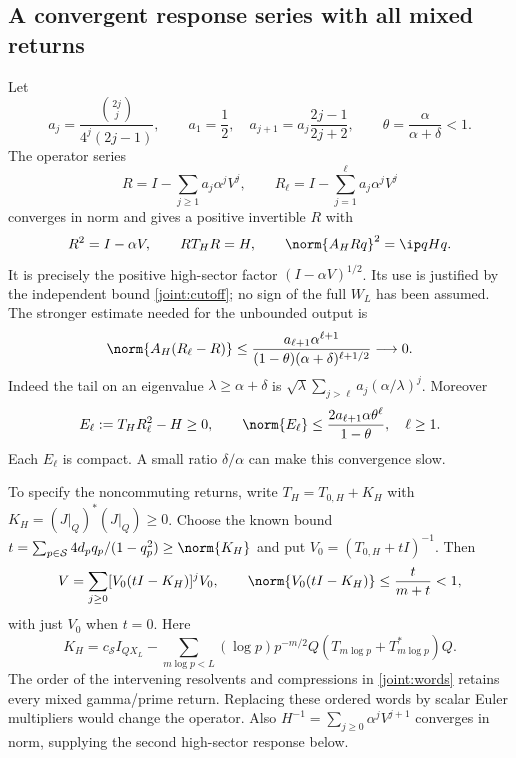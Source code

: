 \subsection{A convergent response series with all mixed returns}
Let
\[
a_j=\frac{\binom{2j}{j}}{4^j(2j-1)},\qquad
a_1=\frac12,\quad a_{j+1}=a_j\frac{2j-1}{2j+2},\qquad
\theta=\frac{\alpha}{\alpha+\delta}<1.
\]
The operator series
\begin{equation}\label{joint:series}
R=I-\sum_{j\ge1}a_j\alpha^jV^j,\qquad
R_\ell=I-\sum_{j=1}^{\ell}a_j\alpha^jV^j
\end{equation}
converges in norm and gives a positive invertible $R$ with
\[
R^2=I-\alpha V,\qquad RT_HR=H,\qquad
\norm{A_HRq}^2=\ip q{Hq}.
\]
It is precisely the positive high-sector factor
$(I-\alpha V)^{1/2}$. Its use is justified by the independent
bound \eqref{joint:cutoff}; no sign of the full $W_L$ has been
assumed.
The stronger estimate needed for the unbounded output is
\begin{equation}\label{joint:tail}
\norm{A_H(R_\ell-R)}
\le\frac{a_{\ell+1}\alpha^{\ell+1}}
 {(1-\theta)(\alpha+\delta)^{\ell+1/2}}\longrightarrow0.
\end{equation}
Indeed the tail on an eigenvalue $\lambda\ge\alpha+\delta$ is
$\sqrt\lambda\sum_{j>\ell}a_j(\alpha/\lambda)^j$.
Moreover
\begin{equation}\label{joint:positive-error}
E_\ell:=T_HR_\ell^2-H\ge0,\qquad
\norm{E_\ell}\le
\frac{2a_{\ell+1}\alpha\theta^\ell}{1-\theta},
\quad\ell\ge1.
\end{equation}
Each $E_\ell$ is compact. A small ratio $\delta/\alpha$ can make
this convergence slow.

To specify the noncommuting returns, write
$T_H=T_{0,H}+K_H$ with $K_H=(J|_Q)^*(J|_Q)\ge0$.
Choose the known bound
$t=\sum_{p\in\mathcal S}4d_pq_p/(1-q_p^2)\ge\norm{K_H}$ and put
$V_0=(T_{0,H}+tI)^{-1}$. Then
\begin{equation}\label{joint:words}
V=\sum_{j\ge0}[V_0(tI-K_H)]^jV_0,\qquad
\norm{V_0(tI-K_H)}\le\frac{t}{m+t}<1,
\end{equation}
with just $V_0$ when $t=0$. Here
\[
K_H=c_{\mathcal S}I_{QX_L}-
\sum_{m\log p<L}(\log p)p^{-m/2}
                      Q(T_{m\log p}+T_{m\log p}^*)Q.
\]
The order of the intervening resolvents and compressions in
\eqref{joint:words} retains every mixed gamma/prime return.
Replacing these ordered words by scalar Euler multipliers would
change the operator. Also
$H^{-1}=\sum_{j\ge0}\alpha^jV^{j+1}$ converges in norm, supplying
the second high-sector response below.

